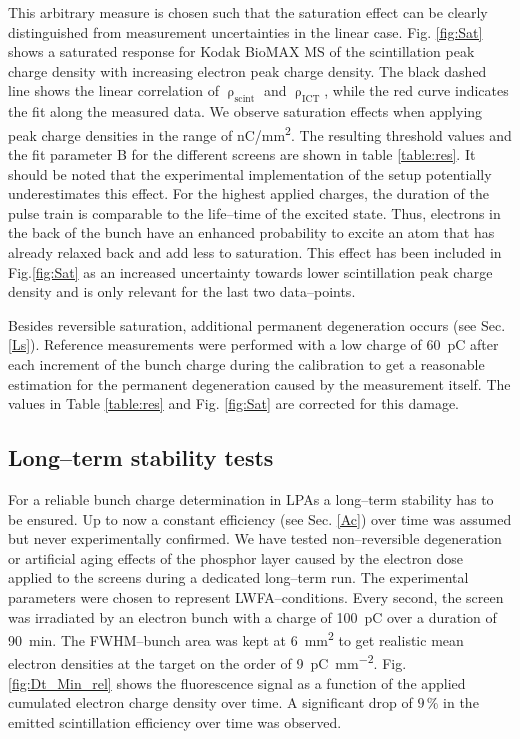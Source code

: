 \documentclass[%
preprint,
amsmath,
amssymb,
aip,
rsi, 
numerical,
floatfix,
]{revtex4-1}
\begin{document}
This arbitrary measure is chosen such that the saturation effect can be clearly distinguished from measurement uncertainties in the linear case. 
Fig. \ref{fig:Sat} shows a saturated response for Kodak BioMAX MS of the scintillation peak charge density  with increasing electron peak charge density. 
The black dashed line shows the linear correlation of $\uprho_{\text{scint}}$ and $\uprho_{\text{ICT}}$, while the red curve indicates the fit along the measured data. 
We observe saturation effects when applying peak charge densities in the range of \si[per-mode=symbol]{\nano\coulomb \per \square\milli\meter}. 
The resulting threshold values and the fit parameter B for the different screens are shown in table \ref{table:res}.
It should be noted that the experimental implementation of the setup potentially underestimates this effect. 
For the highest applied charges, the duration of the pulse train is comparable to the life--time of the excited state.
Thus, electrons in the back of the bunch have an enhanced probability to excite an atom that has already relaxed back and add less to saturation.
This effect has been included in Fig.\ref{fig:Sat} as an increased uncertainty towards lower scintillation peak charge density and is only relevant for the last two data--points.
 
Besides reversible saturation, additional permanent degeneration occurs (see Sec. \ref{Ls}).
Reference measurements were performed with a low charge of \SI{60}{\pico\coulomb} after each increment of the bunch charge during the calibration to get a reasonable estimation for the permanent degeneration caused by the measurement itself.
The values in Table \ref{table:res} and Fig. \ref{fig:Sat} are corrected for this damage.      

\subsection{\label{Ls}Long--term stability tests}
For a reliable bunch charge determination in LPAs a long--term stability has to be ensured.
Up to now a constant efficiency (see Sec. \ref{Ac}) over time was assumed but never experimentally confirmed. 
We have tested non--reversible degeneration or artificial aging effects of the phosphor layer caused by the electron dose applied to the screens during a dedicated long--term run.
The experimental parameters were chosen to represent LWFA--conditions.
Every second, the screen was irradiated by an electron bunch with a charge of \SI{100}{\pico\coulomb} over a duration of \SI{90}{\minute}.
The FWHM--bunch area was kept at \SI{6}{\square\milli\meter} to get realistic mean electron densities at the target on the order of \SI[per-mode=symbol]{9}{\pico\coulomb \per \square\milli\meter}. 
Fig. \ref{fig:Dt_Min_rel} shows the fluorescence signal as a function of the applied cumulated electron charge density over time. 
A significant drop of $9\,\%$ in the emitted scintillation efficiency over time was observed.
 
\end{document}
